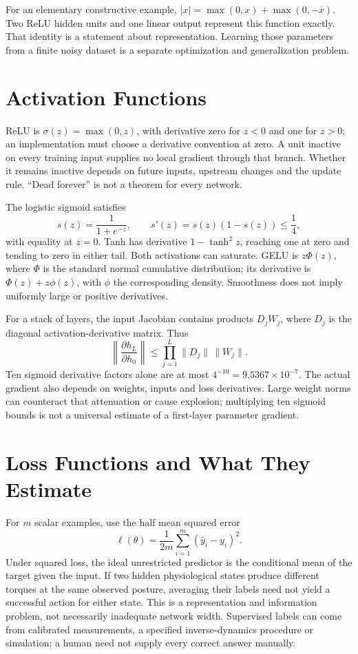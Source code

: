 For an elementary constructive example, $|x|=\max(0,x)+\max(0,-x)$. Two ReLU hidden units and one linear output represent this function exactly. That identity is a statement about representation. Learning those parameters from a finite noisy dataset is a separate optimization and generalization problem.

\section{Activation Functions}

ReLU is $\sigma(z)=\max(0,z)$, with derivative zero for $z<0$ and one for $z>0$; an implementation must choose a derivative convention at zero. A unit inactive on every training input supplies no local gradient through that branch. Whether it remains inactive depends on future inputs, upstream changes and the update rule. ``Dead forever'' is not a theorem for every network.

The logistic sigmoid satisfies
\begin{equation}
s(z)=\frac{1}{1+e^{-z}},\qquad s'(z)=s(z)(1-s(z))\le\frac14,
\end{equation}
with equality at $z=0$. Tanh has derivative $1-\tanh^2z$, reaching one at zero and tending to zero in either tail. Both activations can saturate. GELU is $z\Phi(z)$, where $\Phi$ is the standard normal cumulative distribution; its derivative is $\Phi(z)+z\phi(z)$, with $\phi$ the corresponding density. Smoothness does not imply uniformly large or positive derivatives.

For a stack of layers, the input Jacobian contains products $D_jW_j$, where $D_j$ is the diagonal activation-derivative matrix. Thus
\begin{equation}
\left\|\frac{\partial h_L}{\partial h_0}\right\|
\le\prod_{j=1}^{L}\|D_j\|\,\|W_j\|.
\end{equation}
Ten sigmoid derivative factors alone are at most $4^{-10}=9.5367\times10^{-7}$. The actual gradient also depends on weights, inputs and loss derivatives. Large weight norms can counteract that attenuation or cause explosion; multiplying ten sigmoid bounds is not a universal estimate of a first-layer parameter gradient.

\section{Loss Functions and What They Estimate}

For $m$ scalar examples, use the half mean squared error
\begin{equation}
\ell(\theta)=\frac{1}{2m}\sum_{i=1}^{m}(\hat y_i-y_i)^2.
\end{equation}
Under squared loss, the ideal unrestricted predictor is the conditional mean of the target given the input. If two hidden physiological states produce different torques at the same observed posture, averaging their labels need not yield a successful action for either state. This is a representation and information problem, not necessarily inadequate network width. Supervised labels can come from calibrated measurements, a specified inverse-dynamics procedure or simulation; a human need not supply every correct answer manually.

